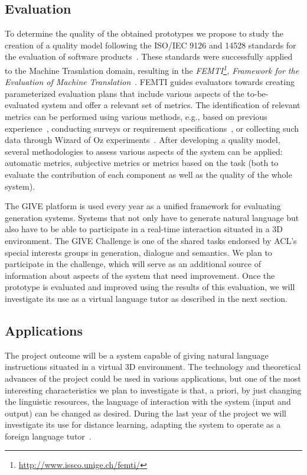 \subsection{Evaluation}
To determine the quality of the obtained prototypes we propose to study the
creation of a quality model following the ISO/IEC
9126 and 14528 standards for the evaluation of software products~\cite{ISO9126-1,ISO14598-1}. These standards were successfully applied to
the Machine Trasnlation domain, resulting in the  \emph{FEMTI\footnote{\url{http://www.issco.unige.ch/femti/}}, Framework for the Evaluation of
Machine Translation}~\cite{Est2005}. FEMTI
guides evaluators towards creating parameterized evaluation
plans that include various aspects of the to-be-evaluated system and offer a
relevant set of metrics. The identification of relevant metrics can be performed
using various methods, e.g., based on previous
experience~\cite{paradise06,Litman2002}, conducting
surveys or requirement specifications~\cite{Lecoeuche98}, or
collecting such data through Wizard of Oz
experiments~\cite{Dahlback93}.
After developing a quality model, several methodologies to assess
various aspects of the system can be applied: automatic metrics,
subjective metrics or metrics based on the task (both to
evaluate the contribution of each component as well as the quality of the whole
system). 

The GIVE platform is used every year as a unified framework for evaluating
generation systems. Systems that not only have to generate natural language
but also have to be able to participate in a real-time interaction situated in a
3D environment. The GIVE Challenge is one of the shared tasks endorsed by
ACL's special interests groups in generation, dialogue and semantics. We plan
to participate in the challenge, which will serve as an additional
source of information about aspects of the system that need
improvement.
Once the prototype is evaluated and improved using the results
of this evaluation, we will investigate its use as a virtual language tutor as
described in the next section.

\subsection{Applications}\label{applications}

The project outcome will be a system capable of giving natural language
instructions situated in a virtual 3D environment. The technology and
theoretical advances of the project could be used in various applications, but
one of the most interesting characteristics we plan to investigate is that, 
a priori, by just changing the linguistic resources, the language of interaction
with the system (input and output) can be changed as desired. During
the last year of the project we will investigate its use for distance learning,
adapting the system to operate as a foreign language tutor~\cite{Wik09}.

